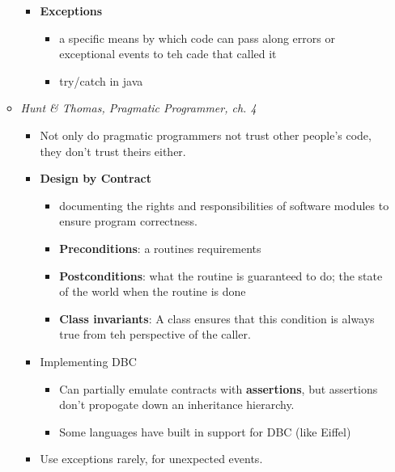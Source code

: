 \documentclass[11pt]{article}
\begin{document}
\begin{itemize}
\begin{itemize}
\begin{itemize}
\item \textbf{Exceptions}
\begin{itemize}
\item a specific means by which code can pass along errors or exceptional events to teh cade that called it
\item try/catch in java
\end{itemize}
\end{itemize}
\item \emph{Hunt \& Thomas, Pragmatic Programmer, ch. 4}
\begin{itemize}
\item Not only do pragmatic programmers not trust other people's code, they don't trust theirs either.
\item \textbf{Design by Contract}
\begin{itemize}
\item documenting the rights and responsibilities of software modules to ensure program correctness.
\item \textbf{Preconditions}: a routines requirements
\item \textbf{Postconditions}: what the routine is guaranteed to do; the state of the world when the routine is done
\item \textbf{Class invariants}: A class ensures that this condition is always true from teh perspective of the caller.
\end{itemize}
\item Implementing DBC
\begin{itemize}
\item Can partially emulate contracts with \textbf{assertions}, but assertions don't propogate down an inheritance hierarchy.
\item Some languages have built in support for DBC (like Eiffel)
\end{itemize}
\item Use exceptions rarely, for unexpected events.
\end{itemize}
\end{itemize}
\end{itemize}
\end{document}

